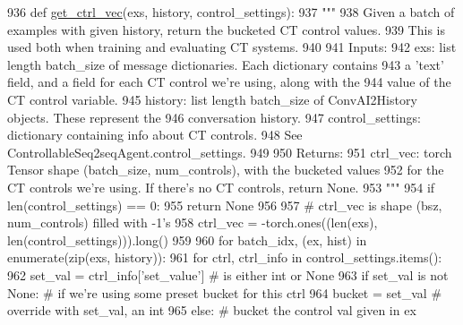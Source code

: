 \begin{DoxyCode}
936 \textcolor{keyword}{def }\hyperlink{namespaceprojects_1_1controllable__dialogue_1_1controllable__seq2seq_1_1controls_a3057eb90e6aeff3fbf2c89c7e003aea0}{get\_ctrl\_vec}(exs, history, control\_settings):
937     \textcolor{stringliteral}{"""}
938 \textcolor{stringliteral}{    Given a batch of examples with given history, return the bucketed CT control values.}
939 \textcolor{stringliteral}{    This is used both when training and evaluating CT systems.}
940 \textcolor{stringliteral}{}
941 \textcolor{stringliteral}{    Inputs:}
942 \textcolor{stringliteral}{      exs: list length batch\_size of message dictionaries. Each dictionary contains}
943 \textcolor{stringliteral}{        a 'text' field, and a field for each CT control we're using, along with the}
944 \textcolor{stringliteral}{        value of the CT control variable.}
945 \textcolor{stringliteral}{      history: list length batch\_size of ConvAI2History objects. These represent the}
946 \textcolor{stringliteral}{        conversation history.}
947 \textcolor{stringliteral}{      control\_settings: dictionary containing info about CT controls.}
948 \textcolor{stringliteral}{        See ControllableSeq2seqAgent.control\_settings.}
949 \textcolor{stringliteral}{}
950 \textcolor{stringliteral}{    Returns:}
951 \textcolor{stringliteral}{      ctrl\_vec: torch Tensor shape (batch\_size, num\_controls), with the bucketed values}
952 \textcolor{stringliteral}{        for the CT controls we're using. If there's no CT controls, return None.}
953 \textcolor{stringliteral}{    """}
954     \textcolor{keywordflow}{if} len(control\_settings) == 0:
955         \textcolor{keywordflow}{return} \textcolor{keywordtype}{None}
956 
957     \textcolor{comment}{# ctrl\_vec is shape (bsz, num\_controls) filled with -1's}
958     ctrl\_vec = -torch.ones((len(exs), len(control\_settings))).long()
959 
960     \textcolor{keywordflow}{for} batch\_idx, (ex, hist) \textcolor{keywordflow}{in} enumerate(zip(exs, history)):
961         \textcolor{keywordflow}{for} ctrl, ctrl\_info \textcolor{keywordflow}{in} control\_settings.items():
962             set\_val = ctrl\_info[\textcolor{stringliteral}{'set\_value'}]  \textcolor{comment}{# is either int or None}
963             \textcolor{keywordflow}{if} set\_val \textcolor{keywordflow}{is} \textcolor{keywordflow}{not} \textcolor{keywordtype}{None}:  \textcolor{comment}{# if we're using some preset bucket for this ctrl}
964                 bucket = set\_val  \textcolor{comment}{# override with set\_val, an int}
965             \textcolor{keywordflow}{else}:  \textcolor{comment}{# bucket the control val given in ex}

\end{DoxyCode}
